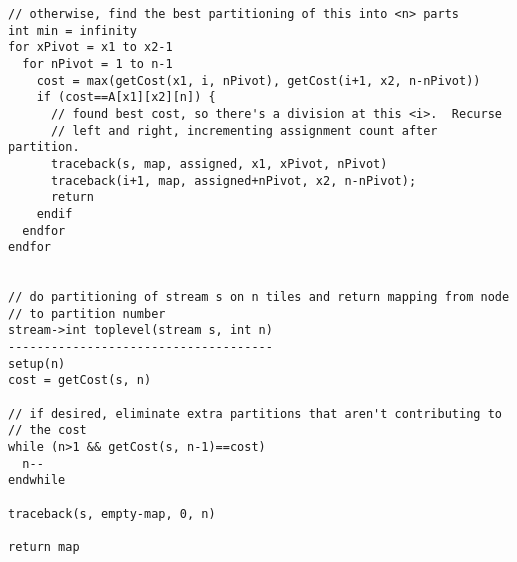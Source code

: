 \begin{verbatim}
// otherwise, find the best partitioning of this into <n> parts
int min = infinity
for xPivot = x1 to x2-1
  for nPivot = 1 to n-1
    cost = max(getCost(x1, i, nPivot), getCost(i+1, x2, n-nPivot))
    if (cost==A[x1][x2][n]) {
      // found best cost, so there's a division at this <i>.  Recurse
      // left and right, incrementing assignment count after partition.
      traceback(s, map, assigned, x1, xPivot, nPivot)
      traceback(i+1, map, assigned+nPivot, x2, n-nPivot);
      return
    endif
  endfor
endfor


// do partitioning of stream s on n tiles and return mapping from node
// to partition number
stream->int toplevel(stream s, int n)
-------------------------------------
setup(n)
cost = getCost(s, n)

// if desired, eliminate extra partitions that aren't contributing to
// the cost
while (n>1 && getCost(s, n-1)==cost)
  n--
endwhile

traceback(s, empty-map, 0, n)

return map

\end{verbatim}
